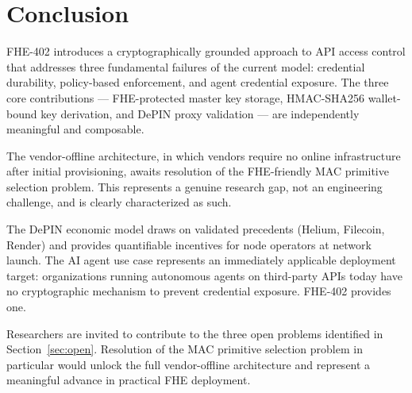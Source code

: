 \documentclass[conference]{IEEEtran}
\begin{document}
\section{Conclusion}
\label{sec:conclusion}

FHE-402 introduces a cryptographically grounded approach to API access control that
addresses three fundamental failures of the current model: credential durability, policy-based
enforcement, and agent credential exposure. The three core contributions --- FHE-protected
master key storage, HMAC-SHA256 wallet-bound key derivation, and DePIN proxy validation ---
are independently meaningful and composable.

The vendor-offline architecture, in which vendors require no online infrastructure after
initial provisioning, awaits resolution of the FHE-friendly MAC primitive selection problem.
This represents a genuine research gap, not an engineering challenge, and is clearly
characterized as such.

The DePIN economic model draws on validated precedents (Helium, Filecoin, Render) and
provides quantifiable incentives for node operators at network launch. The AI agent use
case represents an immediately applicable deployment target: organizations running
autonomous agents on third-party APIs today have no cryptographic mechanism to prevent
credential exposure. FHE-402 provides one.

Researchers are invited to contribute to the three open problems identified in
Section~\ref{sec:open}. Resolution of the MAC primitive selection problem in particular
would unlock the full vendor-offline architecture and represent a meaningful advance in
practical FHE deployment.
\end{document}
